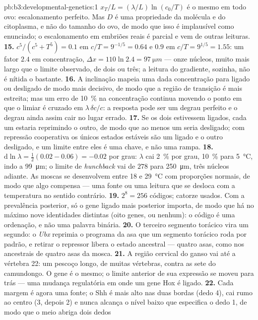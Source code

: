 \begin{solution}{pb:b3:developmental-genetics:1}
$x_{T}/L = (\lambda/L)\ln(c_{0}/T)$ é o mesmo em todo ovo: escalonamento
perfeito. Mas $D$ é uma propriedade da molécula e do citoplasma, e não do
tamanho do ovo, de modo que isso é implausível como enunciado; o
escalonamento em embriões reais é parcial e vem de outras leituras.
\textbf{15.} $c^{5}/(c^{5} + T^{5}) = 0.1$ em $c/T = 9^{-1/5} = 0.64$ e
$0.9$ em $c/T = 9^{1/5} = 1.55$: um fator $2.4$ em concentração,
$\Delta x = 110\ln 2.4 = \qty{97}{\micro m}$ --- onze núcleos, muito
mais largo que o limite observado, de dois ou três; a leitura do
gradiente, sozinha, não é nítida o bastante.
\textbf{16.} A inclinação mapeia uma dada concentração para ligado ou
desligado de modo mais decisivo, de modo que a região de transição é mais
estreita; mas um erro de \qty{10}{\%} na concentração continua movendo o
ponto em que o limiar é cruzado em $\lambda\,\delta c/c$: a resposta pode
ser um degrau perfeito e o degrau ainda assim cair no lugar errado.
\textbf{17.} Se os dois estivessem ligados, cada um estaria reprimindo o
outro, de modo que ao menos um seria desligado; com repressão
cooperativa os únicos estados estáveis são um ligado e o outro
desligado, e um limite entre eles é uma chave, e não uma rampa.
\textbf{18.} $\mathrm{d}\ln\lambda = \tfrac{1}{2}(0.02 - 0.06) = -0.02$
por grau: $\lambda$ cai \qty{2}{\%} por grau, \qty{10}{\%} para
\qty{5}{\celsius}, indo a \qty{99}{\micro m}; o limite de
\emph{hunchback} vai de $278$ para \qty{250}{\micro m}, três núcleos
adiante. As moscas se desenvolvem entre \qty{18}{} e \qty{29}{\celsius}
com proporções normais, de modo que algo compensa --- uma fonte ou uma
leitura que se desloca com a temperatura no sentido contrário.
\textbf{19.} $2^{8} = 256$ códigos; catorze usados. Com a prevalência
posterior, só o gene ligado mais posterior importa, de modo que há no
máximo nove identidades distintas (oito genes, ou nenhum): o código é
uma ordenação, e não uma palavra binária.
\textbf{20.} O terceiro segmento torácico vira um segundo: o \emph{Ubx}
reprimia o programa da asa que um segmento torácico roda por padrão, e
retirar o repressor libera o estado ancestral --- quatro asas, como nos
ancestrais de quatro asas da mosca.
\textbf{21.} A região cervical do ganso vai até a vértebra 22: um pescoço
longo, de muitas vértebras, contra as sete do camundongo. O gene é o
mesmo; o limite anterior de sua expressão se moveu para trás --- uma
mudança regulatória em onde um gene Hox é ligado.
\textbf{22.} Cada margem é agora uma fonte; o Shh é mais alto nas duas
bordas (dedo 4), cai rumo ao centro (3, depois 2) e nunca alcança o
nível baixo que especifica o dedo 1, de modo que o meio abriga dois dedos

\end{solution}
